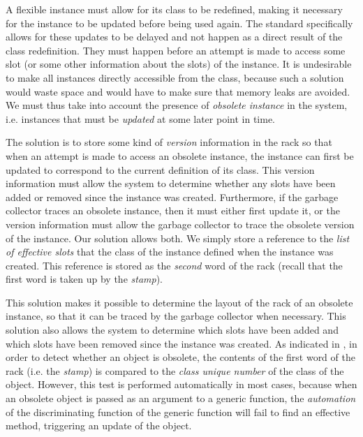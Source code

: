 A flexible instance must allow for its class to be redefined, making
it necessary for the instance to be updated before being used again.  The
standard specifically allows for these updates to be delayed and not
happen as a direct result of the class redefinition.  They must happen
before an attempt is made to access some slot (or some other
information about the slots) of the instance.  It is undesirable to
make all instances directly accessible from the class, because
such a solution would waste space and would have to make sure that
memory leaks are avoided.  We must thus take into account the presence
of \emph{obsolete instance} in the system, i.e. instances that must
be \emph{updated} at some later point in time.



The solution is to store some kind of \emph{version} information in
the rack so that when an attempt is made to access an
obsolete instance, the instance can first be updated to correspond to
the current definition of its class.  This version information must
allow the system to determine whether any slots have been added or
removed since the instance was created.  Furthermore, if the garbage
collector traces an obsolete instance, then it must either first
update it, or the version information must allow the garbage collector
to trace the obsolete version of the instance.  Our solution allows
both.  We simply store a reference to the \emph{list of effective
  slots} that the class of the instance defined when the instance was
created.  This reference is stored as the \emph{second} word of the
rack (recall that the first word is taken up by the
\emph{stamp}). 

This solution makes it possible to determine the layout of the
rack of an obsolete instance, so that it can be traced by
the garbage collector when necessary.  This solution also allows the
system to determine which slots have been added and which slots have
been removed since the instance was created.  As indicated in
, in order to detect
whether an object is obsolete, the contents of the first word of the
rack (i.e. the \emph{stamp}) is compared to the
\emph{class unique number} of the class of the object.  However, this
test is performed automatically in most cases, because when an
obsolete object is passed as an argument to a generic function, the
\emph{automation} of the discriminating function of the generic
function will fail to find an effective method, triggering an update
of the object.

